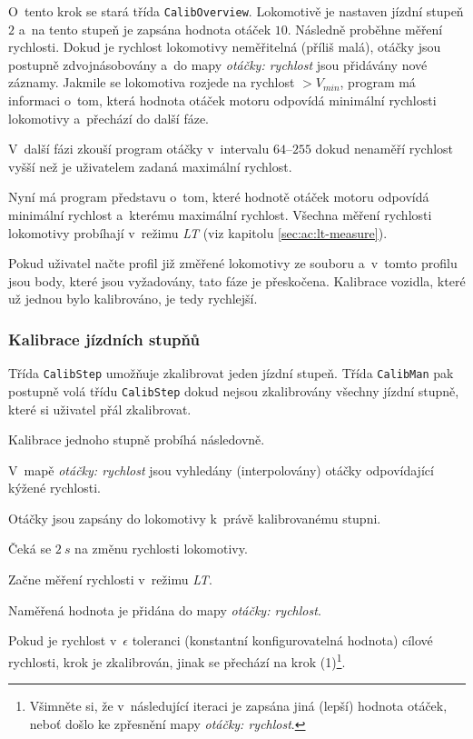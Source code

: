 O~tento krok se stará třída \texttt{CalibOverview}.
Lokomotivě je nastaven jízdní stupeň $2$ a~na tento stupeň je zapsána hodnota otáček
$10$. Následně proběhne měření rychlosti. Dokud je rychlost lokomotivy
neměřitelná (příliš malá), otáčky jsou postupně zdvojnásobovány a~do mapy
\textit{otáčky: rychlost} jsou přidávány nové záznamy. Jakmile se lokomotiva
rozjede na rychlost $> V_{min}$, program má informaci o~tom, která hodnota
otáček motoru odpovídá minimální rychlosti lokomotivy a~přechází do další fáze.

V~další fázi zkouší program otáčky v~intervalu $64$--$255$ dokud nenaměří
rychlost vyšší než je uživatelem zadaná maximální rychlost.

Nyní má program představu o~tom, které hodnotě otáček motoru odpovídá minimální
rychlost a~kterému maximální rychlost. Všechna měření rychlosti lokomotivy
probíhají v~režimu \textit{LT} (viz kapitolu \ref{sec:ac:lt-measure}).

Pokud uživatel načte profil již změřené lokomotivy ze souboru a~v~tom\-to profilu
jsou body, které jsou vyžadovány, tato fáze je přeskočena. Kalibrace vozidla,
které už jednou bylo kalibrováno, je tedy rychlejší.

\subsubsection{Kalibrace jízdních stupňů}

Třída \texttt{CalibStep} umožňuje zkalibrovat jeden jízdní stupeň. Třída
\texttt{CalibMan} pak postupně volá třídu \texttt{CalibStep} dokud nejsou
zkalibrovány všechny jízdní stupně, které si uživatel přál zkalibrovat.

Kalibrace jednoho stupně probíhá následovně.

\begin{compactenum}
\item V~mapě \textit{otáčky: rychlost} jsou vyhledány (interpolovány) otáčky odpovídající
      kýžené rychlosti.
\item Otáčky jsou zapsány do lokomotivy k~právě kalibrovanému stupni.
\item Čeká se $2\ s$ na změnu rychlosti lokomotivy.
\item Začne měření rychlosti v~režimu \textit{LT}.
\item Naměřená hodnota je přidána do mapy \textit{otáčky: rychlost}.
\item Pokud je rychlost v~$\epsilon$ toleranci (konstantní konfigurovatelná hodnota)
      cílové rychlosti, krok je zkalibrován, jinak se přechází na krok
      (1)\footnote{Všimněte si, že v~následující iteraci je zapsána jiná (lepší)
      hodnota otáček, neboť došlo ke zpřesnění mapy \textit{otáčky: rychlost}.}.
\end{compactenum}

